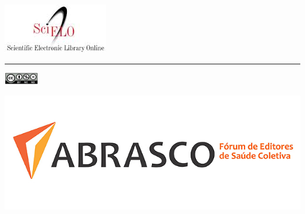 \documentclass[article,scielo,showtrims,times,12pt,trimframe,conselho,spreadimages]{memoir}
\begin{document}
\thispagestyle{plain}
\hspace{-25mm}\noindent\includegraphics[width=.25\textwidth]{logo1.jpg}
\begin{minipage}{4cm}
\vspace{-1cm}
\tiny\revista\par\site\par
\vspace{-1ex}\rule{4cm}{1pt}
\includegraphics[width=15mm]{ccbynp.jpg}
\end{minipage}
\hspace{60mm}\includegraphics[width=.2\textwidth]{logo2.jpg}
\vspace{2cm}

\begin{center}
\titulo

\medskip

\begin{bfseries}
\subtit
\end{bfseries}

\medskip

\autor
\end{center}
\medskip

\noindent 
{}
\medskip


\absleftindent=0pt 
\absrightindent=0pt
\end{document}
